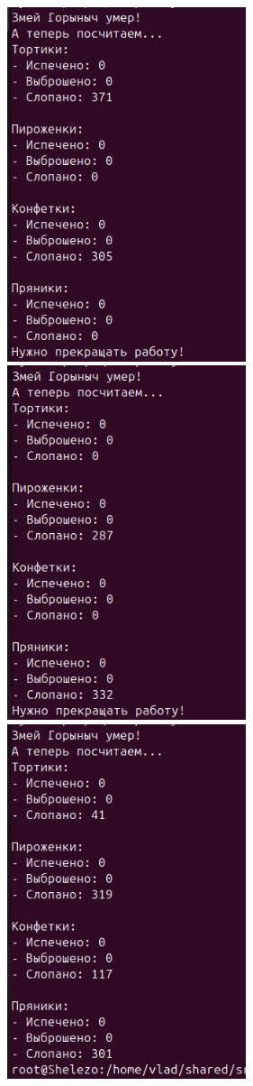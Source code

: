 \documentclass[a4paper,14pt]{extarticle}
\begin{document}
\includegraphics[width=70mm]{processes_output_6_5}
\includegraphics[width=70mm]{processes_output_6_6}
\includegraphics[width=70mm]{processes_output_6_7}\\
\end{document}
